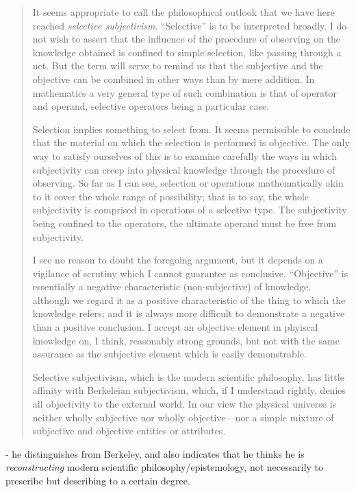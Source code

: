 \begin{quote}
    It seems appropriate to call the philosophical outlook that we have here reached \emph{selective subjectivism}.  ``Selective'' is to be interpreted broadly.  I do not wish to assert that the influence of the procedure of observing on the knowledge obtained is confined to simple selection, like passing through a net.  But the term will serve to remind us that the subjective and the objective can be combined in other ways than by mere addition.  In mathematics a very general type of such combination is that of operator and operand, selective operators being a particular case.
    
    Selection implies something to select from.  It seems permissible to conclude that the material on which the selection is performed is objective.  The only way to satisfy ourselves of this is to examine carefully the ways in which subjectivity can creep into physical knowledge through the procedure of observing.  So far as I can see, selection or operations mathematically akin to it cover the whole range of possibility; that is to say, the whole subjectivity is comprised in operations of a selective type.  The subjectivity being confined to the operators, the ultimate operand must be free from subjectivity.  
    
    I see no reason to doubt the foregoing argument, but it depends on a vigilance of scrutiny which I cannot guarantee as conclusive.  ``Objective'' is essentially a negative characteristic (non-subjective) of knowledge, although we regard it as a positive characteristic of the thing to which the knowledge refers; and it is always more difficult to demonstrate a negative than a positive conclusion.  I accept an objective element in phyiscal knowledge on, I think, reasonably strong grounds, but not with the same assurance as the subjective element which is easily demonstrable.  
    
    Selective subjectivism, which is the modern scientific philosophy, has little affinity with Berkeleian subjectivism, which, if I understand rightly, denies all objectivity to the external world.  In our view the physical universe is neither wholly subjective nor wholly objective---nor a simple mixture of subjective and objective entities or attributes.
    
    \citep[p. 26-27]{Eddington1939}
\end{quote}

- he distinguishes from Berkeley, and also indicates that he thinks he is \emph{reconstructing} modern scientific philosophy/epistemology, not necessarily to prescribe but describing to a certain degree.

